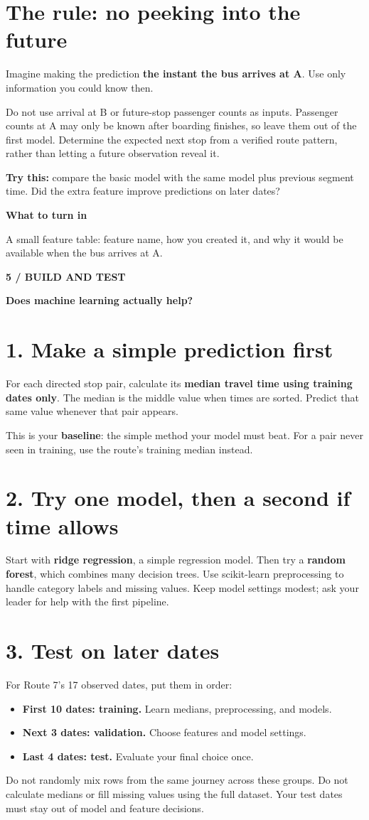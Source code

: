 \documentclass[11pt,letterpaper]{article}
\newcommand{\heading}[2]{{\small\color{accent}\textbf{#1}}\par{\LARGE\bfseries #2}\par\vspace{4pt}}
\newcommand{\turnin}[1]{\vspace{6pt}\colorbox{light}{\parbox{0.96\linewidth}{\textbf{What to turn in}\par #1}}}
\begin{document}
\section*{The rule: no peeking into the future}
Imagine making the prediction \textbf{the instant the bus arrives at A}.
Use only information you could know then.

Do not use arrival at B or future-stop passenger counts as inputs. Passenger
counts at A may only be known after boarding finishes, so leave them out of
the first model. Determine the expected next stop from a verified route pattern,
rather than letting a future observation reveal it.

\textbf{Try this:} compare the basic model with the same model plus previous
segment time. Did the extra feature improve predictions on later dates?

\turnin{A small feature table: feature name, how you created it, and why
it would be available when the bus arrives at A.}

\newpage
\heading{5 / BUILD AND TEST}{Does machine learning actually help?}
\section*{1. Make a simple prediction first}
For each directed stop pair, calculate its \textbf{median travel time using
training dates only}. The median is the middle value when times are sorted.
Predict that same value whenever that pair appears.

This is your \textbf{baseline}: the simple method your model must beat.
For a pair never seen in training, use the route's training median instead.

\section*{2. Try one model, then a second if time allows}
Start with \textbf{ridge regression}, a simple regression model.
Then try a \textbf{random forest}, which combines many decision trees.
Use scikit-learn preprocessing to handle category labels and missing values.
Keep model settings modest; ask your leader for help with the first pipeline.

\section*{3. Test on later dates}
For Route 7's 17 observed dates, put them in order:
\begin{itemize}
\item \textbf{First 10 dates: training.} Learn medians, preprocessing, and models.
\item \textbf{Next 3 dates: validation.} Choose features and model settings.
\item \textbf{Last 4 dates: test.} Evaluate your final choice once.
\end{itemize}
Do not randomly mix rows from the same journey across these groups.
Do not calculate medians or fill missing values using the full dataset.
Your test dates must stay out of model and feature decisions.
\end{document}

